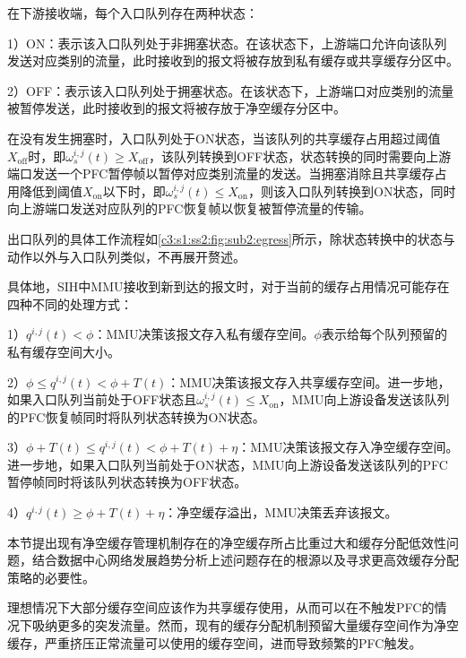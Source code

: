 在下游接收端，每个入口队列存在两种状态：

1）ON：表示该入口队列处于非拥塞状态。在该状态下，上游端口允许向该队列发送对应类别的流量，此时接收到的报文将被存放到私有缓存或共享缓存分区中。

2）OFF：表示该入口队列处于拥塞状态。在该状态下，上游端口对应类别的流量被暂停发送，此时接收到的报文将被存放于净空缓存分区中。

在没有发生拥塞时，入口队列处于ON状态，当该队列的共享缓存占用超过阈值$X_{\text{off}}$时，即$\omega_s^{i,j}(t) \geqslant X_{\text{off}}$，该队列转换到OFF状态，状态转换的同时需要向上游端口发送一个PFC暂停帧以暂停对应类别流量的发送。当拥塞消除且共享缓存占用降低到阈值$X_{\text{on}}$以下时，即$\omega_s^{i,j}(t) \leqslant X_{\text{on}}$，则该入口队列转换到ON状态，同时向上游端口发送对应队列的PFC恢复帧以恢复被暂停流量的传输。

出口队列的具体工作流程如\ref{c3:s1:ss2:fig:sub2:egress}所示，除状态转换中的状态与动作以外与入口队列类似，不再展开赘述。


具体地，SIH中MMU接收到新到达的报文时，对于当前的缓存占用情况可能存在四种不同的处理方式：

1）$q^{i,j}(t)<\phi$：MMU决策该报文存入私有缓存空间。$\phi$表示给每个队列预留的私有缓存空间大小。

2）$\phi \leqslant q^{i,j}(t)< \phi+T(t)$：MMU决策该报文存入共享缓存空间。进一步地，如果入口队列当前处于OFF状态且$\omega_s^{i,j}(t) \leqslant X_{\text{on}}$，MMU向上游设备发送该队列的PFC恢复帧同时将队列状态转换为ON状态。

3）$\phi+T(t) \leqslant q^{i,j}(t)<\phi +T(t)+\eta$：MMU决策该报文存入净空缓存空间。进一步地，如果入口队列当前处于ON状态，MMU向上游设备发送该队列的PFC暂停帧同时将该队列状态转换为OFF状态。

4）$q^{i,j}(t) \geqslant \phi +T(t)+\eta$：净空缓存溢出，MMU决策丢弃该报文。


\label{c3:s2:problem analysic}

本节提出现有净空缓存管理机制存在的净空缓存所占比重过大和缓存分配低效性问题，结合数据中心网络发展趋势分析上述问题存在的根源以及寻求更高效缓存分配策略的必要性。




理想情况下大部分缓存空间应该作为共享缓存使用，从而可以在不触发PFC的情况下吸纳更多的突发流量。然而，现有的缓存分配机制预留大量缓存空间作为净空缓存，严重挤压正常流量可以使用的缓存空间，进而导致频繁的PFC触发。

